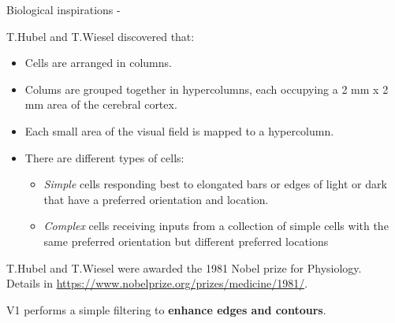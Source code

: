 \begin{frame}[t,allowframebreaks]{Biological inspirations - }
    \framebreak

    T.Hubel and T.Wiesel discovered that:
    \begin{itemize}
        \item Cells are arranged in columns.
        \item Colums are grouped together in hypercolumns, 
          each occupying a 2 mm x 2 mm area of the cerebral cortex.
        \item Each small area of the visual field is mapped to a hypercolumn.
        \item There are different types of cells:
        \begin{itemize}
            \item {\em Simple} cells responding best to elongated
               bars or edges of light or dark 
               that have a preferred orientation and location.
            \item {\em Complex} cells 
               receiving inputs from a collection of simple cells 
               with the same preferred orientation but 
               different preferred locations
        \end{itemize} 
    \end{itemize} 

    \begin{blockexample}{}
        \small
        T.Hubel and T.Wiesel were awarded the 1981 Nobel prize for Physiology.\\
        Details in \url{https://www.nobelprize.org/prizes/medicine/1981/}.
    \end{blockexample}

    \framebreak

    V1 performs a simple filtering to {\bf enhance edges and contours}.

\end{frame}
